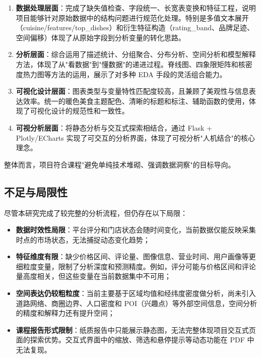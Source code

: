 \documentclass[11pt,a4paper]{article}
\begin{document}
\begin{enumerate}[leftmargin=2em]
    \item \textbf{数据处理层面}：完成了缺失值检查、字段统一、长宽表变换和特征工程，说明项目能够针对原始数据中的结构问题进行规范化处理。特别是多值文本展开（cuisine/features/top\_dishes）和衍生特征构造（rating\_band、品牌足迹、空间偏移）体现了从原始字段到分析变量的转化思路。

    \item \textbf{分析层面}：综合运用了描述统计、分组聚合、分布分析、空间分析和模型解释方法，体现了从"看数据"到"懂数据"的递进过程。脊线图、四象限矩阵和核密度热力图等方法的运用，展示了对多种 EDA 手段的灵活组合能力。

    \item \textbf{可视化设计层面}：图表类型与变量特性匹配度较高，且兼顾了美观性与信息表达效率。统一的暖色美食主题配色、清晰的标题和标注、辅助函数的使用，体现了可视化设计的规范性和一致性。

    \item \textbf{可视分析层面}：将静态分析与交互式探索相结合，通过 Flask + Plotly/ECharts 实现了可交互的分析界面，体现了可视分析"人机结合"的核心理念。
\end{enumerate}

整体而言，项目符合课程"避免单纯技术堆砌、强调数据洞察"的目标导向。

\subsection{不足与局限性}

尽管本研究完成了较完整的分析流程，但仍存在以下局限：

\begin{itemize}[leftmargin=2em]
    \item \textbf{数据时效性局限}：平台评分和门店状态会随时间变化，当前数据仅能反映采集时点的市场状态，无法捕捉动态变化趋势；

    \item \textbf{特征维度有限}：缺少价格区间、评论量、图像信息、营业时间、用户画像等更细粒度变量，限制了分析深度和预测精度。例如，评分可能与价格区间和评论量高度相关，但这些变量在当前数据集中不可用；

    \item \textbf{空间表达仍较粗粒度}：当前主要基于区域均值和经纬度密度做分析，尚未引入道路网络、商圈边界、人口密度和 POI（兴趣点）等外部空间信息，空间分析的精度和解释力还有提升空间；

    \item \textbf{课程报告形式限制}：纸质报告中只能展示静态图，无法完整体现项目交互式页面的探索优势。交互式界面中的缩放、筛选和悬停提示等动态功能在 PDF 中无法复现。
\end{itemize}
\end{document}
